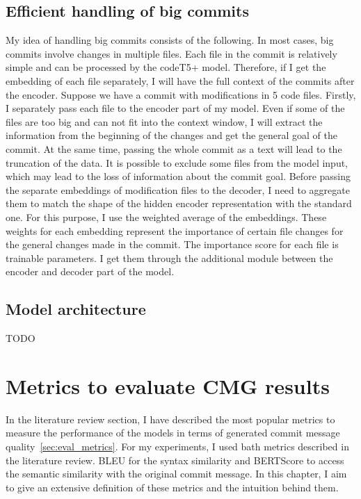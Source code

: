 \subsection{Efficient handling of big commits}
My idea of handling big commits consists of the following. In most cases, big commits involve changes in multiple files. Each file in the commit is relatively simple and can be processed by the codeT5+ model. Therefore, if I get the embedding of each file separately, I will have the full context of the commits after the encoder. Suppose we have a commit with modifications in 5 code files. Firstly, I separately pass each file to the encoder part of my model. Even if some of the files are too big and can not fit into the context window, I will extract the information from the beginning of the changes and get the general goal of the commit. At the same time, passing the whole commit as a text will lead to the truncation of the data. It is possible to exclude some files from the model input, which may lead to the loss of information about the commit goal. Before passing the separate embeddings of modification files to the decoder, I need to aggregate them to match the shape of the hidden encoder representation with the standard one. For this purpose, I use the weighted average of the embeddings. These weights for each embedding represent the importance of certain file changes for the general changes made in the commit. The importance score for each file is trainable parameters. I get them through the additional module between the encoder and decoder part of the model.

\subsection{Model architecture}
TODO

\section{Metrics to evaluate CMG results}
In the literature review section, I have described the most popular metrics to measure the performance of the models in terms of generated commit message quality~\ref{sec:eval_metrics}. For my experiments, I used bath metrics described in the literature review. BLEU for the syntax similarity and BERTScore to access the semantic similarity with the original commit message. In this chapter, I aim to give an extensive definition of these metrics and the intuition behind them.

